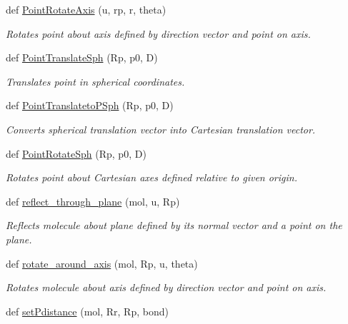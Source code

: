 \begin{DoxyCompactItemize}
def \hyperlink{namespacemolSimplify_1_1Scripts_1_1geometry_ab7f86efbae768b9ed6edfeff4598616b}{Point\+Rotate\+Axis} (u, rp, r, theta)
\begin{DoxyCompactList}\small\item\em Rotates point about axis defined by direction vector and point on axis. \end{DoxyCompactList}\item 
def \hyperlink{namespacemolSimplify_1_1Scripts_1_1geometry_ad39ef08129915708a2ba644855c324ab}{Point\+Translate\+Sph} (Rp, p0, D)
\begin{DoxyCompactList}\small\item\em Translates point in spherical coordinates. \end{DoxyCompactList}\item 
def \hyperlink{namespacemolSimplify_1_1Scripts_1_1geometry_a05bad44739a2ebd5679d059f3d0084b8}{Point\+Translateto\+P\+Sph} (Rp, p0, D)
\begin{DoxyCompactList}\small\item\em Converts spherical translation vector into Cartesian translation vector. \end{DoxyCompactList}\item 
def \hyperlink{namespacemolSimplify_1_1Scripts_1_1geometry_aeacb625442bc7c0d1d4fac98696a0cb1}{Point\+Rotate\+Sph} (Rp, p0, D)
\begin{DoxyCompactList}\small\item\em Rotates point about Cartesian axes defined relative to given origin. \end{DoxyCompactList}\item 
def \hyperlink{namespacemolSimplify_1_1Scripts_1_1geometry_ad14edfe334bcb81ff7f4de4dfd630fc7}{reflect\+\_\+through\+\_\+plane} (mol, u, Rp)
\begin{DoxyCompactList}\small\item\em Reflects molecule about plane defined by its normal vector and a point on the plane. \end{DoxyCompactList}\item 
def \hyperlink{namespacemolSimplify_1_1Scripts_1_1geometry_a90caa7a6dc952df17fce36ea2711eff3}{rotate\+\_\+around\+\_\+axis} (mol, Rp, u, theta)
\begin{DoxyCompactList}\small\item\em Rotates molecule about axis defined by direction vector and point on axis. \end{DoxyCompactList}\item 
def \hyperlink{namespacemolSimplify_1_1Scripts_1_1geometry_a5df8aae5c4383cfebd5d9a62eef388a5}{set\+Pdistance} (mol, Rr, Rp, bond)

\end{DoxyCompactItemize}
